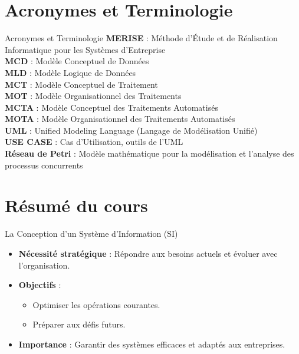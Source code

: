 \documentclass{beamer}
\begin{document}
\section{Acronymes et Terminologie}
\begin{frame}{Acronymes et Terminologie}
    \textbf{MERISE} : Méthode d'Étude et de Réalisation Informatique pour les Systèmes d'Entreprise \\
    \textbf{MCD} : Modèle Conceptuel de Données \\
    \textbf{MLD} : Modèle Logique de Données \\
    \textbf{MCT} : Modèle Conceptuel de Traitement \\
    \textbf{MOT} : Modèle Organisationnel des Traitements \\
    \textbf{MCTA} : Modèle Conceptuel des Traitements Automatisés \\
    \textbf{MOTA} : Modèle Organisationnel des Traitements Automatisés \\
    \textbf{UML} : Unified Modeling Language (Langage de Modélisation Unifié) \\
    \textbf{USE CASE} : Cas d’Utilisation, outils de l'UML \\
    \textbf{Réseau de Petri} : Modèle mathématique pour la modélisation et l’analyse des processus concurrents \\
\end{frame}


\section{Résumé du cours}
\begin{frame}{La Conception d’un Système d’Information (SI)}
    \begin{itemize}
        \item \textbf{Nécessité stratégique} : Répondre aux besoins actuels et évoluer avec l’organisation.
        \item \textbf{Objectifs} :
        \begin{itemize}
            \item Optimiser les opérations courantes.
            \item Préparer aux défis futurs.
        \end{itemize}
        \item \textbf{Importance} : Garantir des systèmes efficaces et adaptés aux entreprises.
    \end{itemize}
\end{frame}
\end{document}
